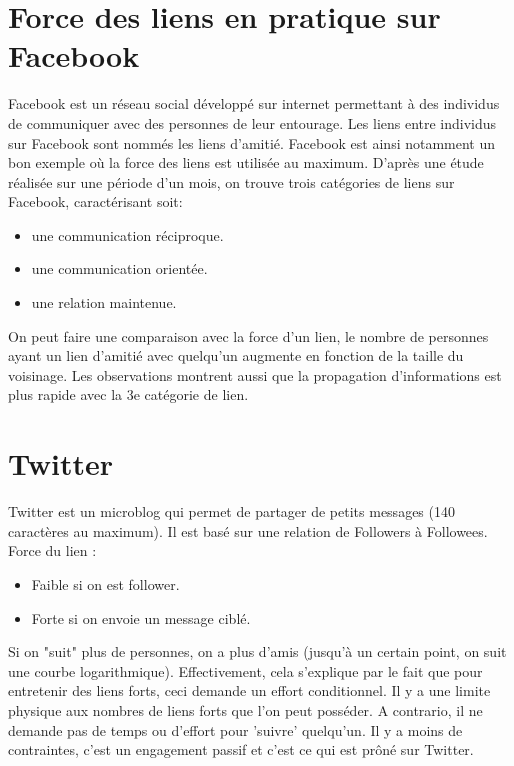 \section*{Force des liens en pratique sur Facebook}
Facebook est un réseau social développé sur internet permettant à des individus de communiquer avec des personnes de leur entourage.
Les liens entre individus sur Facebook sont nommés les liens d'amitié.
Facebook est ainsi notamment un bon exemple où la force des liens est utilisée au maximum.
D'après une étude réalisée sur une période d'un mois, on trouve trois catégories de liens sur Facebook, caractérisant soit:
\begin{itemize}
\item une communication réciproque.
\item une communication orientée.
\item une relation maintenue.
\end{itemize}
On peut faire une comparaison avec la force d'un lien, le nombre de personnes ayant un lien d'amitié avec quelqu'un augmente en fonction de la taille du voisinage. 
Les observations montrent aussi que la propagation d'informations est plus rapide avec la 3e catégorie de lien.
\newline
\section*{Twitter}
Twitter est un microblog qui permet de partager de petits messages (140 caractères au maximum). Il est basé sur une relation de Followers à Followees.
Force du lien :
\begin{itemize}
\item Faible si on est follower.
\item Forte si on envoie un message ciblé.
\end{itemize}
Si on "suit" plus de personnes, on a plus d'amis (jusqu'à un certain point, on suit une courbe logarithmique). Effectivement, cela s'explique par le fait que pour entretenir des liens forts, ceci demande un effort conditionnel. Il y a une limite physique aux nombres de liens forts que l'on peut posséder. A contrario, il ne demande pas de temps ou d'effort pour 'suivre' quelqu'un. Il y a moins de contraintes, c'est un engagement passif et c'est ce qui est prôné sur Twitter.